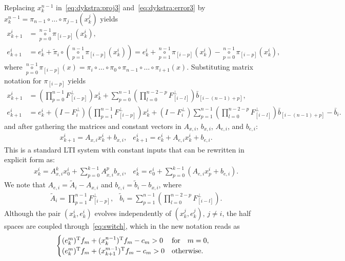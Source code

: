 \documentclass[hidelinks]{article}
\begin{document}
Replacing $x_k^{n-1}$ in~\eqref{eq:dykstra:proj3} and~\eqref{eq:dykstra:error3} by $x_k^{n-1}=\pi_{n-1}\circ\dots\circ\pi_{j-1}(x_k^{j})$ yields
\begin{subequations}
\begin{align}
x_{k+1}^i &= \underset{p=0}{\overset{n-1}{\circ}}\pi_{[i-p]}(x_{k}^i),\\
e_{k+1}^i &= e_k^i+\tilde{\pi}_i\circ\left(\underset{p=1}{\overset{n-1}{\circ}}\pi_{[i-p]}(x_{k}^i)\right)
= e_k^i+\underset{p=1}{\overset{n-1}{\circ}}\pi_{[i-p]}(x_{k}^i)-\underset{p=0}{\overset{n-1}{\circ}}\pi_{[i-p]}(x_{k}^i),
\end{align}\label{eq:dykstra4}
\end{subequations}
where $\underset{p=0}{\overset{n-1}{\circ}}\pi_{[i-p]}(x)=\pi_i\circ\dots\circ\pi_0\circ\pi_{n-1}\circ\dots\circ\pi_{i+1}(x)$. Substituting matrix notation for $\pi_{[i-p]}$ yields
\begin{subequations}
\begin{align}
x_{k+1}^i &= \left(\prod_{p=0}^{n-1}F^\perp_{[i-p]}\right)x_{k}^i+\sum_{p=0}^{n-1}\left(\prod_{l=0}^{n-2-p}F^\perp_{[i-l]}\right)\bar{b}_{[i-(n-1)+p]},\\
e_{k+1}^i &= e_k^i+(I-F^\perp_{i})\left(\prod_{p=1}^{n-1}F^\perp_{[i-p]}\right)x_{k}^i+(I-F^\perp_{i})\sum_{p=1}^{n-1}\left(\prod_{l=0}^{n-2-p}F^\perp_{[i-l]}\right)\bar{b}_{[i-(n-1)+p]} - \bar{b}_i.
\end{align}\label{eq:dykstra4}
\end{subequations}
and after gathering the matrices and constant vectors in $A_{x,i}$, $b_{x,i}$, $A_{e,i}$, and $b_{e,i}$:
\begin{subequations}
\begin{align}
&x_{k+1}^i = A_{x,i} x_{k}^i+b_{x,i},
&e_{k+1}^i = e_k^i+A_{e,i} x_{k}^i+b_{e,i}.
\end{align}
\end{subequations}
This is a standard LTI system with constant inputs that can be rewritten in explicit form as:
\begin{subequations}
\begin{align}
&x_{k}^i = A_{x,i}^k x_{0}^i+\sum_{p=0}^{k-1}A_{x,i}^p b_{x,i},
&e_{k}^i = e_0^i+\sum_{p=0}^{k-1}(A_{e,i} x_{p}^i+b_{e,i}).
\end{align}
\end{subequations}
We note that $A_{e,i}=\tilde{A}_i-A_{x,i}$ and $b_{e,i}=\tilde{b}_i-b_{x,i}$, where
\begin{align*}
&\tilde{A}_i=\prod_{p=1}^{n-1}F^\perp_{[i-p]},
&\tilde{b}_i=\sum_{p=1}^{n-1}\left(\prod_{l=0}^{n-2-p}F^\perp_{[i-l]}\right).
\end{align*}
Although the pair $(x_k^i, e_k^i)$ evolves independently of  $(x_k^j, e_k^j),\,j\neq i$, the half spaces are coupled through~\eqref{eq:switch}, which in the new notation reads as
\begin{align}\label{eq:switch2}
\begin{cases}
(e_k^{m})^{\text{T}} f_{m}+(x_{k}^{n-1})^{\text{T}} f_{m}-c_{m} > 0 & \text{for}\quad m=0,\\
(e_k^{m})^{\text{T}} f_{m}+(x_{k+1}^{m-1})^{\text{T}} f_{m}-c_{m} > 0 & \text{otherwise.}
\end{cases}
\end{align}
\end{document}
